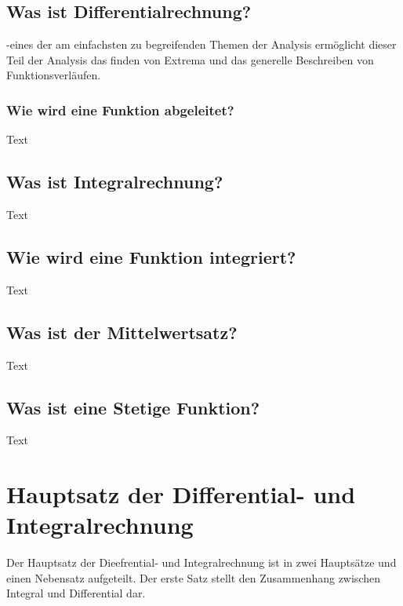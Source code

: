 \documentclass[fontsize=12pt,paper=a4,DIV12,cleardoublepage=empty, 
liststotoc,idxtotoc,bibtotoc]{article}
\theoremstyle{plain}
\theoremstyle{definition}
\begin{document}
	
	\subsection{Was ist Differentialrechnung?}
	-eines der am einfachsten zu begreifenden Themen der Analysis ermöglicht dieser Teil der Analysis das finden von Extrema und das generelle Beschreiben von Funktionsverläufen.
	
	
	\subsubsection{Wie wird eine Funktion abgeleitet?}
		Text
	
	
	\subsection{Was ist Integralrechnung?}
		Text


	\subsection{Wie wird eine Funktion integriert?}
		Text
		
	
	\subsection{Was ist der Mittelwertsatz?}
		Text
		
	
	\subsection{Was ist eine Stetige Funktion?}
		Text	
	
	
	
	
	\section{Hauptsatz der Differential- und Integralrechnung}
	
	Der Hauptsatz der Dieefrential- und Integralrechnung ist in zwei Hauptsätze und einen Nebensatz aufgeteilt. Der erste Satz stellt den Zusammenhang zwischen Integral und Differential dar.
\end{document}
